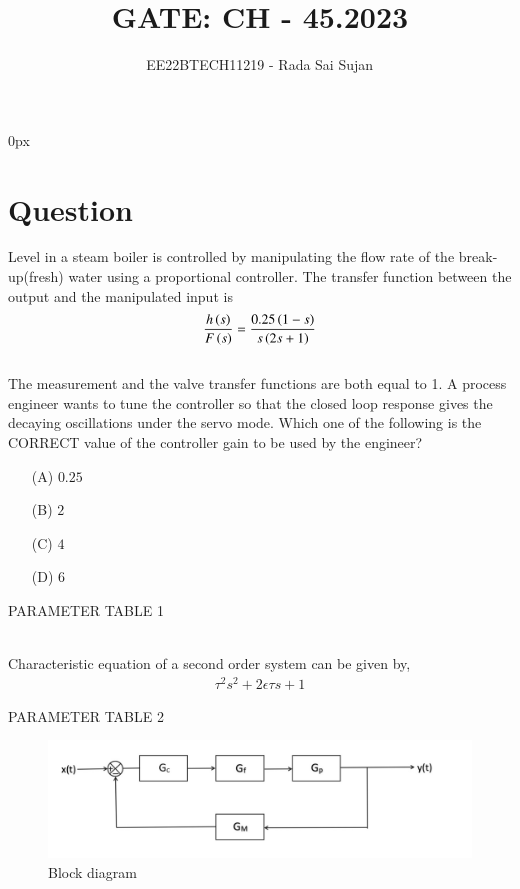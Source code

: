 \documentclass[journal,12pt,twocolumn]{IEEEtran}
\theoremstyle{remark}
\begin{document}
\parindent 0px

\title{GATE: CH - 45.2023}
\author{EE22BTECH11219 - Rada Sai Sujan$^{}$%
}
\maketitle
\newpage
\bigskip
\section*{Question}
Level  in a steam boiler is controlled by manipulating the flow rate  of the break-up(fresh) water using a proportional  controller. The transfer function between the output and the manipulated input is   \\
$$ \frac{h\left(s\right)}{F\left(s\right)}=\frac{0.25\left(1-s\right)}{s\left(2s+1\right)} $$   \\
The measurement and the valve transfer functions are both equal to 1. A process engineer wants to tune the controller so that the closed loop response gives the decaying oscillations under the servo mode. Which one of the following is the CORRECT value of the controller gain to be used by the engineer? \\
\begin{enumerate}
    \item[(A)] $0.25$
    \item[(B)] $2$
    \item[(C)] $4$
    \item[(D)] $6$
\end{enumerate}
\solution
\begin{table}[ht]
    \centering
    
    \caption{PARAMETER TABLE 1}
    \label{tab:ch.45.1}
\end{table} \\
Characteristic equation of a second order system can be given by,
\begin{align}
    \tau ^2s^2+2\epsilon \tau s+1 \label{eq:x}
\end{align}
\begin{table}[]
    \centering
    
    \caption{PARAMETER TABLE 2}
    \label{tab:ch.45.2}
\end{table}
\begin{figure}[ht]
    \centering
    \includegraphics[width=\columnwidth]{figs/block.png}
    \caption{Block diagram}
    \label{fig:ch.45.1}
\end{figure}    \\
\end{document}
